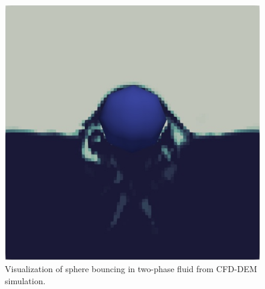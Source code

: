 \begin{figure}[H]
\begin{minipage}{.4\textwidth}
    \end{minipage}%
    \hspace{0.06\textwidth}
    \begin{minipage}{.4\textwidth}
        \centering
        \includegraphics[width=\linewidth]{GWU_Thesis_Sarmakeeva/Images/chap4/water_sphere/sphere_in_water12.png}
    \end{minipage}
    \caption{Visualization of sphere bouncing in two-phase fluid from CFD-DEM simulation.}
    \label{fig:two-phase_sphere}
\end{figure}



